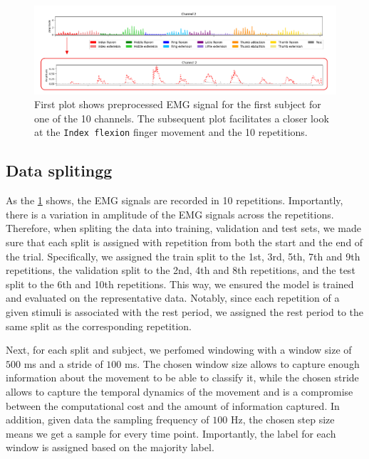 \documentclass[10pt]{article}
\begin{document}
\begin{figure}[h]
    \centering
    \includegraphics[width=1\textwidth]{../figures/preprocessing.pdf}
    \caption{First plot shows preprocessed EMG signal for the first subject for one of the 10 channels. The subsequent plot facilitates a closer look 
    at the \texttt{Index flexion} finger movement and the 10 repetitions. }
    \label{fig:preprocessing}
\end{figure}

\subsection{Data splitingg}
As the \ref{fig:preprocessing} shows, the EMG signals are recorded in 10 repetitions. Importantly,
there is a variation in amplitude of the EMG signals across the repetitions. Therefore, when spliting the data into training, validation and test sets, 
we made sure that each split is assigned with repetition from both the start and the end of the trial. Specifically,
we assigned the train split to the 1st, 3rd, 5th, 7th and 9th repetitions, the validation split to the 2nd, 4th and 8th repetitions, and the test split to the 6th and 10th repetitions.
This way, we ensured the model is trained and evaluated on the representative data. Notably, since each repetition of a given stimuli is associated with the rest period,
we assigned the rest period to the same split as the corresponding repetition.

Next, for each split and subject, we perfomed windowing with a window size of $500$ ms and a stride of $100$ ms. The chosen window size
allows to capture enough information about the movement to be able to classify it, while the chosen stride allows to capture the temporal dynamics of the movement and 
is a compromise between the computational cost and the amount of information captured. In addition, given data the sampling frequency of $100$ Hz, the chosen step size
means we get a sample for every time point. Importantly, the label for each window is assigned based on the majority label.
\end{document}
